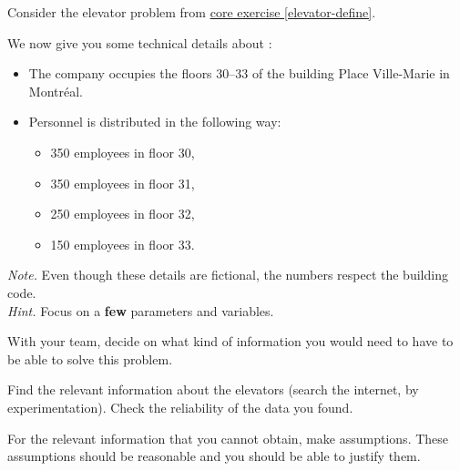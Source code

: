 \begin{minipage}{.5\textwidth}	
\question
\label{elevator-assumptions}
Consider the elevator problem from \hyperref[elevator-define]{core exercise \ref{elevator-define}}. 


We now give you some technical details about :

\begin{itemize}
	\item The company occupies the floors 30--33 of the building Place Ville-Marie in Montr\'eal.

	\item Personnel is distributed in the following way: 
	\begin{itemize}
		\item 350 employees in floor 30,
		\item 350 employees in floor 31,
		\item 250 employees in floor 32, 
		\item 150 employees in floor 33.
	\end{itemize}
\end{itemize}

\emph{Note.} Even though these details are fictional, the numbers respect the building code. \\

\emph{Hint.} Focus on a \textbf{few} parameters and variables.
\end{minipage}
\qquad
\begin{minipage}{.5\textwidth}	
\email
\end{minipage}

\begin{parts} 

	\item With your team, decide on what kind of information you would need to have to be able to solve this problem.

	\item Find the relevant information about the elevators (search the internet, by experimentation). Check the reliability of the data you found.

	\item For the relevant information that you cannot obtain, make assumptions. These assumptions should be reasonable and you should be able to justify them.
\end{parts}

